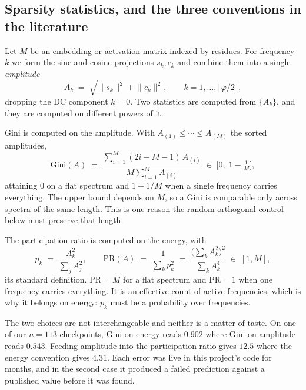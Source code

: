 \subsection{Sparsity statistics, and the three conventions in the literature}
\label{sec:methods-sparsity}

Let $M$ be an embedding or activation matrix indexed by residues. For frequency $k$ we form
the sine and cosine projections $s_{k}, c_{k}$ and combine them into a single
\emph{amplitude}
\begin{equation}
  \label{eq:amplitude}
  A_{k} \;=\; \sqrt{\lVert s_{k} \rVert^{2} + \lVert c_{k} \rVert^{2}},
  \qquad k = 1, \dots, \lfloor \varphi/2 \rfloor,
\end{equation}
dropping the DC component $k = 0$. Two statistics are computed from $\{A_{k}\}$, and they are
computed on different powers of it.

Gini is computed on the amplitude. With $A_{(1)} \le \cdots \le A_{(M)}$ the sorted
amplitudes,
\begin{equation}
  \label{eq:gini}
  \mathrm{Gini}(A) \;=\;
  \frac{\sum_{i=1}^{M} (2i - M - 1)\, A_{(i)}}{M \sum_{i=1}^{M} A_{(i)}}
  \;\in\; \bigl[0,\; 1 - \tfrac{1}{M}\bigr],
\end{equation}
attaining $0$ on a flat spectrum and $1 - 1/M$ when a single frequency carries everything.
The upper bound depends on $M$, so a Gini is comparable only across spectra of the same
length. This is one reason the random-orthogonal control below must preserve that length.

The participation ratio is computed on the energy, with
\begin{equation}
  \label{eq:pr}
  p_{k} \;=\; \frac{A_{k}^{2}}{\sum_{j} A_{j}^{2}},
  \qquad
  \mathrm{PR}(A) \;=\; \frac{1}{\sum_{k} p_{k}^{2}}
  \;=\; \frac{\bigl(\sum_{k} A_{k}^{2}\bigr)^{2}}{\sum_{k} A_{k}^{4}}
  \;\in\; [1, M] ,
\end{equation}
its standard definition. $\mathrm{PR} = M$ for a flat spectrum and $\mathrm{PR} = 1$ when one
frequency carries everything. It is an effective count of active frequencies, which is why it
belongs on energy: $p_{k}$ must be a probability over frequencies.

The two choices are not interchangeable and neither is a matter of taste. On one of our
$n = 113$ checkpoints, Gini on energy reads $0.902$ where Gini on amplitude reads $0.543$.
Feeding amplitude into the participation ratio gives $12.5$ where the energy convention gives
$4.31$. Each error was live in this project's code for months, and in the second
case it produced a failed prediction against a published value before it was found.

